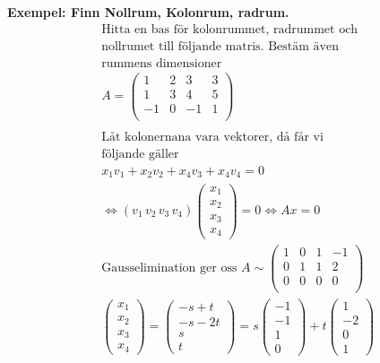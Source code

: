 \begin{multicols}{2}
\textbf{Exempel: Finn Nollrum, Kolonrum, radrum.} 
\begin{align*}
  &\text{Hitta en bas för kolonrummet, radrummet och} \\
  &\text{nollrumet till följande matris. Bestäm även} \\
  &\text{rummens dimensioner} \\
  &A = 
  \left(\begin{array}{cccc}
    1 & 2 &  3 & 3  \\
    1 & 3 &  4 & 5  \\
   -1 & 0 & -1 & 1  \\
  \end{array}\right)  \\
  &\\
  &\text{Låt kolonernana vara vektorer, då får vi} \\
  &\text{följande gäller }  \\
  &x_1v_1 + x_2v_2 + x_4v_3 + x_4v_4 = 0 \\
  &\Leftrightarrow (v_1 \, v_2 \, v_3 \, v_4)
  \begin{pmatrix} x_1 \\ x_2 \\ x_3 \\ x_4 \end{pmatrix} = 0 \Leftrightarrow{} Ax=0 \\
  &\text{Gausselimination ger oss } A \sim{}
  \left(\begin{array}{cccc}
    1 & 0 & 1 & -1  \\
    0 & 1 & 1 &  2  \\
    0 & 0 & 0 &  0  \\
  \end{array}\right)  \\
  &\begin{pmatrix} x_1 \\ x_2 \\ x_3 \\ x_4 \end{pmatrix} =
  \begin{pmatrix} -s+t \\ -s-2t \\ s \\ t \end{pmatrix} =
  s\begin{pmatrix} -1 \\ -1 \\ 1 \\ 0 \end{pmatrix} +
  t\begin{pmatrix} 1 \\ -2 \\ 0 \\ 1 \end{pmatrix} \\

\end{align*}
\end{multicols}
